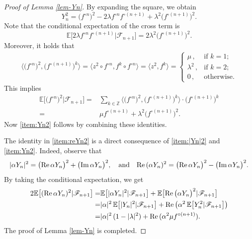\documentclass[11pt, reqno]{amsart}
\theoremstyle{definition}
\newtheorem*{Brown-Eagleson Theorem}{The Brown-Eagleson Theorem}
\newcommand{\F}{\mathscr F}
\newcommand{\E}{\mathbb E}
\newcommand{\la}{\langle}
\newcommand{\ra}{\rangle}
\begin{document}
\begin{proof}[Proof of Lemma \ref{lem-Yn}]
		By expanding the square, we obtain $$Y_n^2 = \big(f^{\circ n}\big)^2- 2 \lambda f^{\circ n} f^{\circ (n+1)} + \lambda^2 \big(f^{\circ (n+1)}\big)^2.$$ 
		Note that the conditional expectation of the cross term is $$\E\big[2 \lambda f^{\circ n} f^{\circ (n+1)} | \F_{n+1}\big] =  2 \lambda^2  \big(f^{\circ (n+1)}\big)^2 .$$
		Moreover, it holds that 
		\begin{align*} 
			\big\la \big(f^{\circ n}\big)^2 , \big(f^{\circ (n+1)}\big)^k \big\ra = \big\la z^2 \circ f^{\circ n}, f^k \circ f^{\circ n}\big\ra= \big\la z^2 , f^k\big\ra =
				\begin{cases}
					\mu\, , &   \text{if }k=1; \\ 
					 \lambda^2 \, , &  \text{if }k=2;\\
					 0\, , & \text{otherwise}.
				\end{cases}
		\end{align*}
		This implies 
		\begin{align*} 
			\E\big[ \big(f^{\circ n}\big)^2  | \F_{n+1}\big] =& \sum_{k\in \mathbb Z} \big\la \big( f^{\circ n}\big)^2 , \big(f^{\circ (n+1)}\big)^k \big\ra \cdot \big(f^{\circ (n+1)}\big)^k\\ 
			=&\mu f^{\circ (n+1)} + \lambda^2 \big(f^{\circ (n+1)}\big)^2.
	\end{align*}
	Now \ref{item:Yn2} follows by combining these identities.
	
	The identity in \ref{item:reYn2} is a direct consequence of \ref{item:|Yn|2} and \ref{item:Yn2}. Indeed, observe that $$|\alpha Y_n|^2 = \big( {\rm Re}\, \alpha Y_n \big)^2 + \big({\rm Im}\, \alpha Y_n \big)^2, \quad \text{and}\quad {\rm Re}\, (\alpha Y_n)^2 = \big( {\rm Re}\, \alpha Y_n \big)^2 - \big({\rm Im}\, \alpha Y_n \big)^2.$$
	By taking the conditional expectation, we get 
	\begin{align*} 
		2 \E\big[({\rm Re}\, \alpha Y_n)^2 |\mathscr F_{n+1}\big]=& \E\big[ |\alpha Y_n|^2 | \F_{n+1}\big]+ \E\big[  {\rm Re}\, \big(\alpha Y_n \big)^2 | \F_{n+1}\big]\\
		=& |\alpha |^2 \,\E\big[ |Y_n|^2 | \F_{n+1}\big]+ {\rm Re}\, \big( \alpha^2 \, \E\big[ Y_n^2 | \F_{n+1}\big]\big)\\
		=& |\alpha|^2\,(1-|\lambda|^2)+ {\rm Re}\,(\alpha^2 \mu f^{\circ (n+1)}).
	\end{align*}
	The proof of Lemma \ref{lem-Yn} is completed.
	\end{proof}
\end{document}
